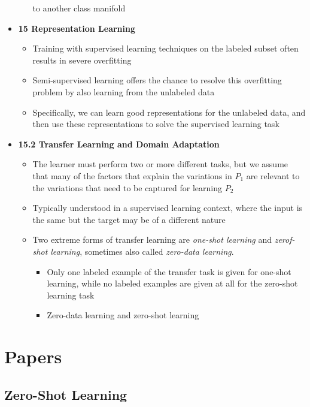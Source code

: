 \documentclass[12pt]{article}
\begin{document}
\begin{itemize}
\begin{itemize}
    to another class manifold
  \end{itemize}
\item \textbf{15 Representation Learning}
  \begin{itemize}
  \item Training with supervised learning techniques on the labeled
    subset often results in severe overfitting
  \item Semi-supervised learning offers the chance to resolve this
    overfitting problem by also learning from the unlabeled data
  \item Specifically, we can learn good representations for the
    unlabeled data, and then use these representations to solve the
    supervised learning task
  \end{itemize}
\item \textbf{15.2 Transfer Learning and Domain Adaptation}
  \begin{itemize}
  \item The learner must perform two or more different tasks,
    but we assume that many of the factors that explain the variations
    in $P_1$ are relevant to the variations that need to be captured
    for learning $P_2$
  \item Typically understood in a supervised learning context, where the
    input is the same but the target may be of a different nature
  \item Two extreme forms of transfer learning are \textit{one-shot learning}
    and \textit{zerof-shot learning}, sometimes also called
    \textit{zero-data learning}.
    \begin{itemize}
    \item Only one labeled example of the transfer task is given for
      one-shot learning, while no labeled examples are given at all for
      the zero-shot learning task
    \item Zero-data learning \cite{larochelle2008} and zero-shot learning
      \cite{Palatucci:2009:ZLS:2984093.2984252, socher2013zeroshot}
      \end{itemize}
    \end{itemize}
\end{itemize}

\section{Papers}

\subsection{Zero-Shot Learning}
\end{document}
